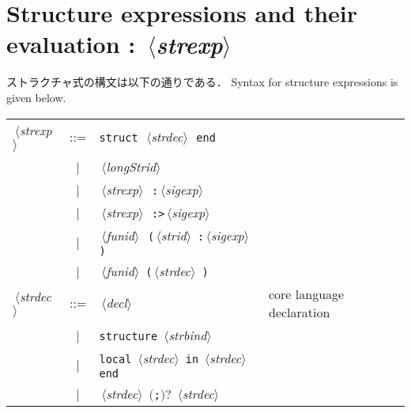 \documentclass{jbook}
\newcommand{\txt}[2]{#2}
\newcommand{\vbar}{\mbox{\ $|$\ }}
\newcommand{\nonterm}[1]{\mbox{$\,\langle$}{\it #1}\mbox{$\rangle\,$}}
\newcommand{\term}[1]{\mbox{{\tt #1}}}
\newcommand{\optional}[1]{\mbox{$($}{\protect #1}\mbox{$)?$}}
\begin{document}
\section{
\txt{ストラクチャ式とその評価}{Structure expressions and their evaluation} : \nonterm{strexp}
}

\ifjp%
	ストラクチャ式の構文は以下の通りである．
\else%
	Syntax for structure expressions is given below.
\fi%

\begin{center}
\begin{tabular}{lcll}
\nonterm{strexp} &::=& \term{struct}\ \nonterm{strdec}\ \term{end} \\
&\vbar& \nonterm{longStrid} \\
&\vbar& \nonterm{strexp}\ \term{:}\nonterm{sigexp}\\
&\vbar& \nonterm{strexp}\ \term{:>}\nonterm{sigexp}\\
&\vbar& \nonterm{funid}\ \term{(}\nonterm{strid}
	\term{:}\nonterm{sigexp}\term{)} \\
&\vbar& \nonterm{funid} \term{(}\nonterm{strdec} \term{)} \\
\nonterm{strdec} &::=& \nonterm{decl} & \txt{核言語の宣言}{core language declaration}\\
&\vbar& \term{structure} \nonterm{strbind}\\
&\vbar& \term{local} \nonterm{strdec} \term{in} \nonterm{strdec} \term{end}\\
&\vbar& \nonterm{strdec} \optional{\term{;}} \nonterm{strdec}
\end{tabular}
\end{center}
\end{document}
